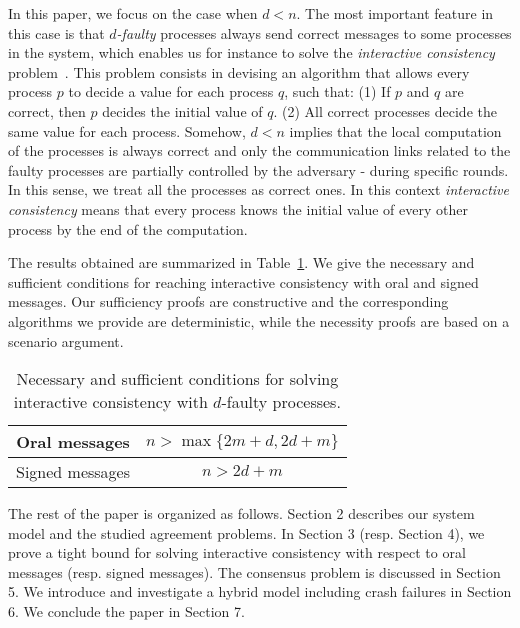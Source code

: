 \documentclass[11pt,letterpaper]{article}
\newcommand{\tmem}[1]{{\em #1\/}}
\begin{document}
In this paper, we focus on the case when $d<n$.
The most important feature in this case is that {\tmem{$d$-faulty}}
processes always send correct messages to some processes in the system,
which enables us for instance to solve the \tmem{interactive consistency} problem~\cite{fischer1983consensus}. This problem consists in devising an algorithm
that allows every process $p$ to decide a value for each process $q$,
such that: (1) If $p$ and $q$ are correct, then $p$ decides the
initial value of $q$. (2) All correct processes decide the same
value for each process. Somehow, $d<n$ implies that the local
computation of the processes is always correct and only the
communication links related to the faulty processes are partially
controlled by the adversary - during specific rounds.
In this sense, we treat all the processes as
correct ones. In this context {\tmem{interactive consistency}}
means that every process knows the initial value of every other
process by the end of the computation.

The results obtained are summarized in
Table~\ref{tab:results}. We give the necessary and sufficient
conditions for reaching interactive consistency with oral and signed
messages. Our sufficiency proofs are constructive and the corresponding algorithms
we provide are deterministic, while the necessity proofs are based on a 
scenario argument.


\begin{table}[h]
\centering
\begin{tabular}{|c|c|}
\hline
Oral messages & $n> \max \{ 2m+d,2d+m \}$\\
\hline
Signed messages & $n>2d+m$\\
\hline
\end{tabular}
\caption{\label{tab:results}Necessary and sufficient conditions for solving
interactive consistency with $d$-faulty processes.}
\end{table}

The rest of the paper is organized as follows. Section 2 describes our system model and the studied agreement problems. In Section 3 (resp. Section 4), we prove a  tight bound for solving interactive consistency   with respect to oral messages (resp. signed messages). The consensus problem is discussed in Section 5. We introduce and investigate a hybrid model including crash failures in Section 6.
We conclude the paper  in Section 7.













\newpage




\newpage
\appendix


\end{document}
